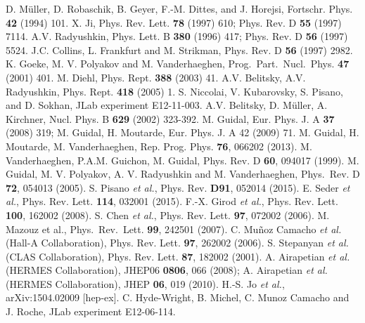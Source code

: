\documentclass[a4paper,12pt]{report}
\begin{document}
\begin{thebibliography}{99}


D. M\"uller, D. Robaschik, B. Geyer, F.-M. Dittes, and J. Horejsi, Fortschr. Phys. {\bf 42} (1994) 101.
 X. Ji, Phys. Rev. Lett. {\bf 78} (1997) 610;
Phys. Rev. D {\bf 55} (1997) 7114.
 A.V. Radyushkin, Phys. Lett. B {\bf 380} (1996) 417; Phys. Rev. D {\bf 56} (1997) 5524.
 J.C. Collins, L. Frankfurt and M. Strikman, Phys. Rev. D {\bf 56} (1997) 2982.
 K. Goeke, M. V. Polyakov and M. Vanderhaeghen, Prog.\ Part.\ Nucl.\ Phys. {\bf 47} (2001) 401.
 M. Diehl, Phys.  Rept. {\bf 388} (2003) 41.
 A.V. Belitsky, A.V. Radyushkin, Phys. Rept. {\bf 418} (2005) 1.
 S. Niccolai, V. Kubarovsky, S. Pisano, and D. Sokhan, JLab experiment E12-11-003.
 A.V. Belitsky, D. M\"uller, A. Kirchner, Nucl. Phys. B {\bf 629} (2002) 323-392.
 M. Guidal, Eur. Phys. J. A {\bf 37} (2008) 319; M. Guidal, H. Moutarde, Eur. Phys. J. A 42 (2009) 71.
 M. Guidal, H. Moutarde, M. Vanderhaeghen, Rep. Prog. Phys. {\bf 76}, 066202 (2013).
 M. Vanderhaeghen, P.A.M. Guichon, M. Guidal, Phys. Rev. D {\bf 60}, 094017 (1999).
 M. Guidal, M. V. Polyakov, A. V. Radyushkin and 
M. Vanderhaeghen, Phys.\ Rev. D {\bf 72}, 054013 (2005).
 S. Pisano {\it et al.}, Phys. Rev. {\bf D91}, 052014 (2015).
 E. Seder {\it et al.}, Phys. Rev. Lett. {\bf 114}, 032001 (2015).
 F.-X. Girod {\it et al.}, Phys. Rev. Lett. {\bf 100}, 162002 (2008).
 S. Chen {\it et al.}, Phys. Rev. Lett. {\bf 97}, 072002 (2006).
 M. Mazouz et al., Phys.\ Rev.\ Lett. {\bf 99}, 242501 (2007).
 C. Mu\~noz Camacho {\it et al.} (Hall-A Collaboration), Phys. Rev. Lett. {\bf 97}, 262002 (2006).
 S. Stepanyan {\it et al.} (CLAS Collaboration), Phys. Rev. Lett. {\bf 87}, 182002 (2001).
 A. Airapetian {\it et al.} (HERMES Collaboration), JHEP06 {\bf 0806}, 066 (2008); A. Airapetian {\it et al.} (HERMES Collaboration), JHEP {\bf 06}, 019 (2010).
 H.-S. Jo {\it et al.}, arXiv:1504.02009 [hep-ex].
  C. Hyde-Wright, B. Michel, C. Munoz Camacho and J. Roche, JLab experiment E12-06-114.

\end{thebibliography}
\end{document}

